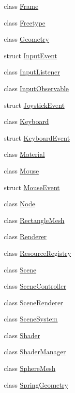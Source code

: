 \begin{DoxyCompactItemize}
\item 
class \mbox{\hyperlink{classec_1_1_frame}{Frame}}
\item 
class \mbox{\hyperlink{classec_1_1_freetype}{Freetype}}
\item 
class \mbox{\hyperlink{classec_1_1_geometry}{Geometry}}
\item 
struct \mbox{\hyperlink{structec_1_1_input_event}{Input\+Event}}
\item 
class \mbox{\hyperlink{classec_1_1_input_listener}{Input\+Listener}}
\item 
class \mbox{\hyperlink{classec_1_1_input_observable}{Input\+Observable}}
\item 
struct \mbox{\hyperlink{structec_1_1_joystick_event}{Joystick\+Event}}
\item 
class \mbox{\hyperlink{classec_1_1_keyboard}{Keyboard}}
\item 
struct \mbox{\hyperlink{structec_1_1_keyboard_event}{Keyboard\+Event}}
\item 
class \mbox{\hyperlink{classec_1_1_material}{Material}}
\item 
class \mbox{\hyperlink{classec_1_1_mouse}{Mouse}}
\item 
struct \mbox{\hyperlink{structec_1_1_mouse_event}{Mouse\+Event}}
\item 
class \mbox{\hyperlink{classec_1_1_node}{Node}}
\item 
class \mbox{\hyperlink{classec_1_1_rectangle_mesh}{Rectangle\+Mesh}}
\item 
class \mbox{\hyperlink{classec_1_1_renderer}{Renderer}}
\item 
class \mbox{\hyperlink{classec_1_1_resource_registry}{Resource\+Registry}}
\item 
class \mbox{\hyperlink{classec_1_1_scene}{Scene}}
\item 
class \mbox{\hyperlink{classec_1_1_scene_controller}{Scene\+Controller}}
\item 
class \mbox{\hyperlink{classec_1_1_scene_renderer}{Scene\+Renderer}}
\item 
class \mbox{\hyperlink{classec_1_1_scene_system}{Scene\+System}}
\item 
class \mbox{\hyperlink{classec_1_1_shader}{Shader}}
\item 
class \mbox{\hyperlink{classec_1_1_shader_manager}{Shader\+Manager}}
\item 
class \mbox{\hyperlink{classec_1_1_sphere_mesh}{Sphere\+Mesh}}
\item 
class \mbox{\hyperlink{classec_1_1_spring_geometry}{Spring\+Geometry}}

\end{DoxyCompactItemize}
